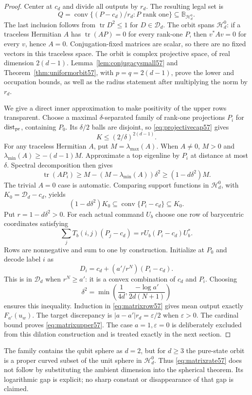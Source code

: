 \begin{proof}
Center at $c_d$ and divide all outputs by $r_d$. The resulting legal set is
\[
 Q=\operatorname{conv}\{(P-c_d)/r_d:P\text{ rank one}\}\subseteq\mathbb B_{\mathcal H_d^0}.
\]
The last inclusion follows from $\operatorname{tr}D^2\le1$ for $D\in\mathcal D_d$. The orbit spans $\mathcal H_d^0$: if a traceless Hermitian $A$ has $\operatorname{tr}(AP)=0$ for every rank-one $P$, then $v^*Av=0$ for every $v$, hence $A=0$. Conjugation-fixed matrices are scalar, so there are no fixed vectors in this traceless space. The orbit is complex projective space, of real dimension $2(d-1)$. Lemma~\ref{lem:conjugacysmall57} and Theorem~\ref{thm:uniformorbit57}, with $p=q=2(d-1)$, prove the lower and occupation bounds, as well as the radius statement after multiplying the norm by $r_d$.

We give a direct inner approximation to make positivity of the upper rows transparent. Choose a maximal $\delta$-separated family of rank-one projections $P_i$ for $\operatorname{dist}_{\rm pr}$, containing $P_0$. Its $\delta/2$ balls are disjoint, so \eqref{eq:projectivecap57} gives
\[
                         K\le(2/\delta)^{2(d-1)}.
\]
For any traceless Hermitian $A$, put $M=\lambda_{\max}(A)$. When $A\ne0$, $M>0$ and $\lambda_{\min}(A)\ge-(d-1)M$. Approximate a top eigenline by $P_i$ at distance at most $\delta$. Spectral decomposition then gives
\begin{equation}\label{eq:matrixsupport57}
 \operatorname{tr}(AP_i)\ge M-(M-\lambda_{\min}(A))\delta^2
                         \ge(1-d\delta^2)M.
\end{equation}
The trivial $A=0$ case is automatic. Comparing support functions in $\mathcal H_d^0$, with $K_0=\mathcal D_d-c_d$, yields
\[
 (1-d\delta^2)K_0\subseteq\operatorname{conv}\{P_i-c_d\}\subseteq K_0.
\]
Put $r=1-d\delta^2>0$. For each actual command $U_b$ choose one row of barycentric coordinates satisfying
\begin{equation}\label{eq:matrixrow57}
 \sum_jT_b(i,j)(P_j-c_d)=rU_b(P_i-c_d)U_b^*.
\end{equation}
Rows are nonnegative and sum to one by construction. Initialize at $P_0$ and decode label $i$ as
\[
                  D_i=c_d+(a'/r^N)(P_i-c_d).
\]
This is in $\mathcal D_d$ when $r^N\ge a'$: it is a convex combination of $c_d$ and $P_i$. Choosing
\[
 \delta^2=\min\left(\frac1{4d},\frac{-\log a'}{2d(N+1)}\right)
\]
ensures this inequality. Induction in \eqref{eq:matrixrow57} gives mean output exactly $F_{a'}(u_w)$. The target discrepancy is $|a-a'|r_d=\varepsilon/2$ when $\varepsilon>0$. The cardinal bound proves \eqref{eq:matrixupper57}. The case $a=1,\varepsilon=0$ is deliberately excluded from this dilation construction and is treated exactly in the next section.
\end{proof}
The family contains the qubit sphere as $d=2$, but for $d\ge3$ the pure-state orbit is a proper curved subset of the unit sphere in $\mathcal H_d^0$. Thus \eqref{eq:matrixrate57} does not follow by substituting the ambient dimension into the spherical theorem. Its logarithmic gap is explicit; no sharp constant or disappearance of that gap is claimed.

